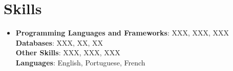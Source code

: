 \documentclass[letterpaper,11pt]{article}
\begin{document}
\section{Skills}
\begin{itemize}[leftmargin=0.15in, label={}]
    \item\small{
        \textbf{Programming Languages and Frameworks}{: XXX, XXX, XXX} \\
        \textbf{Databases}{: XXX, XX, XX} \\
        \textbf{Other Skills}{: XXX, XXX, XXX} \\
        \textbf{Languages}{: English, Portuguese, French}}
    \vspace{-4pt}
\end{itemize}

\end{document}
